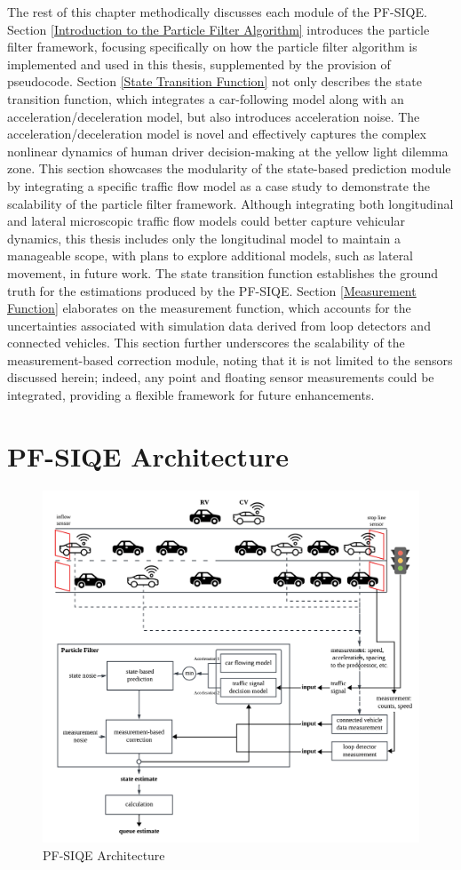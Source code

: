 The rest of this chapter methodically discusses each module of the PF-SIQE. Section \ref{Introduction to the Particle Filter Algorithm} introduces the particle filter framework, focusing specifically on how the particle filter algorithm is implemented and used in this thesis, supplemented by the provision of pseudocode. Section \ref{State Transition Function} not only describes the state transition function, which integrates a car-following model along with an acceleration/deceleration model, but also introduces acceleration noise. The acceleration/deceleration model is novel and effectively captures the complex nonlinear dynamics of human driver decision-making at the yellow light dilemma zone. This section showcases the modularity of the state-based prediction module by integrating a specific traffic flow model as a case study to demonstrate the scalability of the particle filter framework. Although integrating both longitudinal and lateral microscopic traffic flow models could better capture vehicular dynamics, this thesis includes only the longitudinal model to maintain a manageable scope, with plans to explore additional models, such as lateral movement, in future work. The state transition function establishes the ground truth for the estimations produced by the PF-SIQE. Section \ref{Measurement Function} elaborates on the measurement function, which accounts for the uncertainties associated with simulation data derived from loop detectors and connected vehicles. This section further underscores the scalability of the measurement-based correction module, noting that it is not limited to the sensors discussed herein; indeed, any point and floating sensor measurements could be integrated, providing a flexible framework for future enhancements.



\section{PF-SIQE Architecture}\label{PF-SIQE Architecture}
\begin{figure}[!htbp]
    \centering
    \includegraphics[width= 0.85\linewidth]{figures/architecture(1).png}
    \caption{PF-SIQE Architecture}
    \label{fig: PF-SIQE Architecture}
\end{figure}

